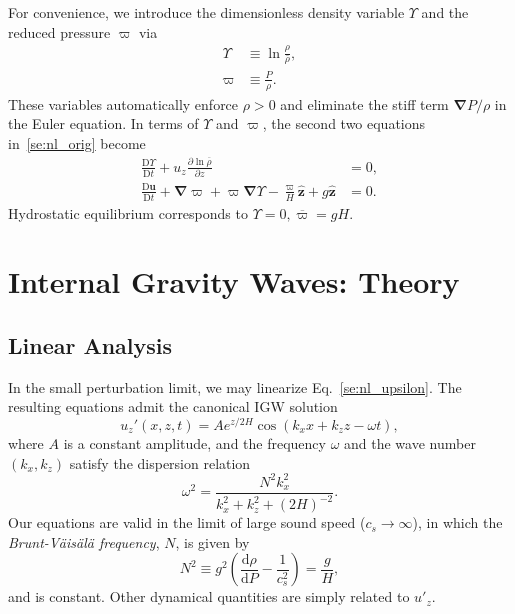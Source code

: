 \documentclass[
        fleqn,
        usenatbib,
    ]{mnras}
\newcommand*{\rd}[2]{\frac{\mathrm{d}#1}{\mathrm{d}#2}}
\newcommand*{\pd}[2]{\frac{\partial#1}{\partial#2}}
\newcommand*{\md}[2]{\frac{\mathrm{D}#1}{\mathrm{D}#2}}
\newcommand*{\p}[1]{\left(#1\right)}
\newcommand*{\bm}[1]{\mathbf{#1}}
\newcommand*{\uv}[1]{\hat{\mathbf{#1}}}
\begin{document}
For convenience, we introduce the dimensionless density variable $\Upsilon$ and
the reduced pressure $\varpi$ \citep[e.g.][]{lecoanet_anel} via
\begin{align}
    \Upsilon &\equiv \ln \frac{\rho}{\bar{\rho}},\\
    \varpi &\equiv \frac{P}{\rho}.
\end{align}
These variables automatically enforce $\rho > 0$ and eliminate the stiff term
$\bm{\nabla} P / \rho$ in the Euler equation. In terms of $\Upsilon$ and
$\varpi$, the second two equations in~\eqref{se:nl_orig} become
\begin{subequations}\label{se:nl_upsilon}
    \begin{align}
        \md{\Upsilon}{t} + u_z \pd{\ln \overline{\rho}}{z} &= 0
            ,\label{eq:nl_up_density} \\
        \md{\bm{u}}{t} + \bm{\nabla}\varpi + \varpi\bm{\nabla}\Upsilon
            - \frac{\varpi}{H}\uv{z} + g\uv{z} &= 0\label{eq:nl_upsilon_u}.
    \end{align}
\end{subequations}
Hydrostatic equilibrium corresponds to $\Upsilon = 0, \overline{\varpi} = gH$.

\section{Internal Gravity Waves: Theory}\label{s:theory}

\subsection{Linear Analysis}\label{ss:lin_analysis}

In the small perturbation limit, we may linearize Eq.~\eqref{se:nl_upsilon}.
The resulting equations admit the canonical IGW solution
\citep{drazin,sutherland0}
\begin{equation}
    u_z'\p{x, z, t} = Ae^{z/2H}\cos\p{k_{x}x + k_{z}z - \omega t},
        \label{eq:lin_sol}
\end{equation}
where $A$ is a constant amplitude, and the frequency $\omega$ and the wave
number $\p{k_x, k_z}$ satisfy the dispersion relation
\begin{equation}
    \omega^2 = \frac{N^2k_{x}^2}{k_{x}^2 + k_{z}^2 + \p{2H}^{-2}}.
        \label{eq:disp_rel}
\end{equation}
Our equations are valid in the limit of large sound speed ($c_s \to \infty$), in
which the \emph{Brunt-V\"ais\"al\"a frequency}, $N$, is given by
\begin{equation}
    N^2 \equiv g^2\p{\rd{\rho}{P} - \frac{1}{c_s^2}} = \frac{g}{H},
\end{equation}
and is constant. Other dynamical quantities are simply related to $u'_z$.
\end{document}
